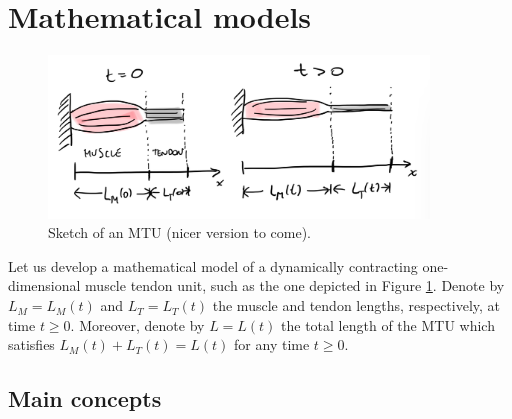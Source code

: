 \documentclass{sfuthesis}
\numberwithin{equation}{chapter}
\numberwithin{figure}{chapter}
\numberwithin{table}{chapter}
\theoremstyle{definition}
\begin{document}

\section{Mathematical models}

\begin{figure}
    \centering
    \includegraphics[width=0.9\textwidth]{mtu_sketch.jpeg}
    \caption{Sketch of an MTU (nicer version to come).}
    \label{fig:mtu_sketch}
\end{figure}

Let us develop a mathematical model of a dynamically contracting one-dimensional muscle tendon unit, such as the one depicted in Figure \ref{fig:mtu_sketch}. Denote by $L_M = L_M(t)$ and $L_T= L_T(t)$ the muscle and tendon lengths, respectively, at time $t \geq 0$. Moreover, denote by $L = L(t)$ the total length of the MTU which satisfies $L_M(t) + L_T(t) = L(t)$ for any time $t \geq 0$.

\subsection{Main concepts}
\end{document}
